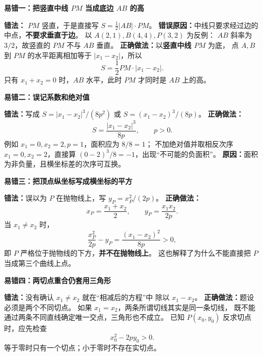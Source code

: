 \begin{trapbox}
    \par\noindent\begin{minipage}{\linewidth}
    \textbf{\textcolor{CTrap}{易错一：把竖直中线 $PM$ 当成底边 $AB$ 的高}}

    
    \end{minipage}\par

    \textbf{错法：} $PM$ 竖直，于是直接写
    $S=\frac12|AB|\cdot PM$。
    \textbf{错误原因：}中线只要求经过边的中点，\textbf{不要求垂直于边}。
    以 $A(2,1),B(4,4),P(3,2)$ 为反例：
    $AB$ 斜率为 $3/2$，故竖直的 $PM$ 不与 $AB$ 垂直。
    \textbf{正确做法：}以\textbf{竖直中线 $PM$} 为底，
    点 $A,B$ 到 $PM$ 的水平距离相加等于 $|x_1-x_2|$，所以
    \[
        \boxed{S=\frac12 PM\cdot|x_1-x_2|}.
    \]
    只有 $x_1+x_2=0$ 时，$AB$ 水平，此时 $PM$ 才同时是 $AB$ 上的高。

    \medskip
    \textbf{\textcolor{CTrap}{易错二：误记系数和绝对值}}

    \textbf{错法：}写成 $S=|x_1-x_2|^3/(8p^2)$ 或
    $S=(x_1-x_2)^3/(8p)$。
    \textbf{正确做法：}
    \[
        \boxed{S=\frac{|x_1-x_2|^3}{8p}},\qquad p>0.
    \]
    例如 $x_1=0,x_2=2,p=1$，面积应为 $8/8=1$；
    不加绝对值并取相反次序 $x_1=0,x_2=2$，直接算
    $(0-2)^3/8=-1$，出现“不可能的负面积”。
    \textbf{原因：}面积为非负量，且横坐标差的次序可互换。

    \medskip
    \par\noindent\begin{minipage}{\linewidth}
    \textbf{\textcolor{CTrap}{易错三：把顶点纵坐标写成横坐标的平方}}

    
    \end{minipage}\par

    \textbf{错法：}误以为 $P$ 在抛物线上，写
    $y_P=x_P^2/(2p)$。
    \textbf{正确做法：}
    \[
        x_P=\frac{x_1+x_2}{2},\qquad
        y_P=\frac{x_1x_2}{2p}.
    \]
    当 $x_1\ne x_2$ 时，
    \[
        \frac{x_P^2}{2p}-y_P
        =\frac{(x_1-x_2)^2}{8p}>0,
    \]
    即 $P$ 严格位于抛物线的下方，\textbf{并不在抛物线上}。
    这也解释了为什么不能直接把 $P$ 当成第三个曲线上点。

    \medskip
    \textbf{\textcolor{CTrap}{易错四：两切点重合仍套用三角形}}

    \textbf{错法：}没有确认 $x_1\ne x_2$ 就在“相减后的方程”中
    除以 $x_1-x_2$。
    \textbf{正确做法：}题设必须是两个不同切点。
    如果 $x_1=x_2$，两条所谓切线其实是同一条切线，
    既不能通过两条不同直线确定唯一交点，三角形也不成立。
    已知 $P(x_0,y_0)$ 反求切点时，应先检查
    \[
        x_0^2-2py_0>0.
    \]
    等于零时只有一个切点；小于零时不存在实切点。


\end{trapbox}
